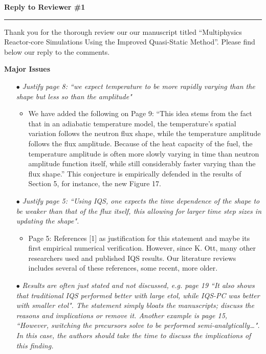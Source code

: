 \documentclass[11pt]{letter}
\newcommand{\iqspc}{IQS-PC\xspace}
\newcommand{\section}[1]{\textbf{#1}}
\newcommand{\working}{$\bullet$}
\newcommand{\done}{$\bullet$}
\newcommand{\easy}[1]{{\textit{#1}}}
\newcommand{\medm}[1]{{\textit{#1}}}
\begin{document}


\large{\textbf{Reply to Reviewer \#1}}\hrule\small

Thank you for the thorough review our our manuscript titled ``Multiphysics Reactor-core Simulations Using the Improved Quasi-Static Method''. Please find below our reply to the comments.


\section{Major Issues}

\begin{itemize}

\item[\done] \medm{ Justify page 8: ``we expect temperature to be more rapidly varying than the shape but less so than the amplitude" }
\begin{itemize}
\item We have added the following on Page 9: ``This idea stems from the fact that in an adiabatic temperature model, the temperature's spatial variation follows the neutron flux shape, while the temperature amplitude follows the flux amplitude. Because of the heat capacity of the fuel, the temperature amplitude is often more slowly varying in time than neutron amplitude function itself, while still considerably faster varying than the flux shape.'' This conjecture is empirically defended in the results of Section 5, for instance, the new Figure 17.
\end{itemize}

\item[\done] \easy{ Justify page 5: ``Using IQS, one expects the time dependence of the shape to be weaker than that of the flux itself, this allowing for larger time step sizes in updating the shape". }
\begin{itemize}
\item Page 5: References [1] as justification for this statement and maybe its first empirical numerical verification. However, since K. Ott, many other researchers used and published IQS results. Our literature reviews includes several of these references, some recent, more older.
\end{itemize}

\item[\working] \medm{  Results are often just stated and not discussed, e.g. page 19 ``It also shows that traditional IQS performed better with large etol, while \iqspc was better with smaller etol". The statement simply bloats the manuscripts; discuss the reasons and implications or remove it. Another example is page 15, ``However, switching the precursors solve to be performed semi-analytically…".  In this case, the authors should take the time to discuss the implications of this finding. }


\end{itemize}
\end{document}
